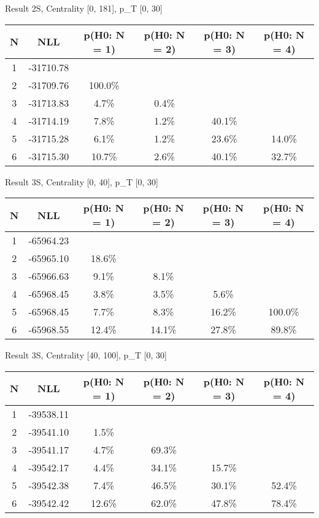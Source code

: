 Result 2S, Centrality [0, 181], p_{T} [0, 30]
\begin{table}[h!]
	\centering
	\begin{tabular}{cc||cccc}
		N & NLL & p(H0: N = 1) & p(H0: N = 2) & p(H0: N = 3) & p(H0: N = 4)\\ 
		\hline
1 & -31710.78 & & & & \\
2 & -31709.76 & 100.0\% & & & \\
3 & -31713.83 & 4.7\% & 0.4\% & & \\
4 & -31714.19 & 7.8\% & 1.2\% & 40.1\% & \\
5 & -31715.28 & 6.1\% & 1.2\% & 23.6\% & 14.0\% \\
6 & -31715.30 & 10.7\% & 2.6\% & 40.1\% & 32.7\% \\
	\end{tabular}
	\label{tab:lab}
\end{table}

Result 3S, Centrality [0, 40], p_{T} [0, 30]
\begin{table}[h!]
	\centering
	\begin{tabular}{cc||cccc}
		N & NLL & p(H0: N = 1) & p(H0: N = 2) & p(H0: N = 3) & p(H0: N = 4)\\ 
		\hline
1 & -65964.23 & & & & \\
2 & -65965.10 & 18.6\% & & & \\
3 & -65966.63 & 9.1\% & 8.1\% & & \\
4 & -65968.45 & 3.8\% & 3.5\% & 5.6\% & \\
5 & -65968.45 & 7.7\% & 8.3\% & 16.2\% & 100.0\% \\
6 & -65968.55 & 12.4\% & 14.1\% & 27.8\% & 89.8\% \\
	\end{tabular}
	\label{tab:lab}
\end{table}

Result 3S, Centrality [40, 100], p_{T} [0, 30]
\begin{table}[h!]
	\centering
	\begin{tabular}{cc||cccc}
		N & NLL & p(H0: N = 1) & p(H0: N = 2) & p(H0: N = 3) & p(H0: N = 4)\\ 
		\hline
1 & -39538.11 & & & & \\
2 & -39541.10 & 1.5\% & & & \\
3 & -39541.17 & 4.7\% & 69.3\% & & \\
4 & -39542.17 & 4.4\% & 34.1\% & 15.7\% & \\
5 & -39542.38 & 7.4\% & 46.5\% & 30.1\% & 52.4\% \\
6 & -39542.42 & 12.6\% & 62.0\% & 47.8\% & 78.4\% \\
	\end{tabular}
	\label{tab:lab}
\end{table}

